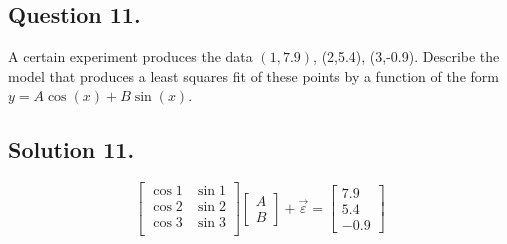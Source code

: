 \documentclass{article}
\begin{document}
\subsection*{Question 11.}
A certain experiment produces the data $(1,7.9)$, (2,5.4), (3,-0.9). Describe the model that produces a least squares fit of these points by a function of the form $y=A\cos(x)+B\sin(x)$.
\subsection*{Solution 11.}
\[
\left[
\begin{array}{rr}
 \cos 1 &  \sin 1 \\
 \cos 2 &  \sin 2 \\
 \cos 3 &  \sin 3 \\
\end{array}
\right]
\left[
\begin{array}{r}A\\B
\end{array}
\right]
+\Vec{\varepsilon}=
\left[
\begin{array}{r}7.9\\5.4\\-0.9
\end{array}
\right]
\]
\end{document}
